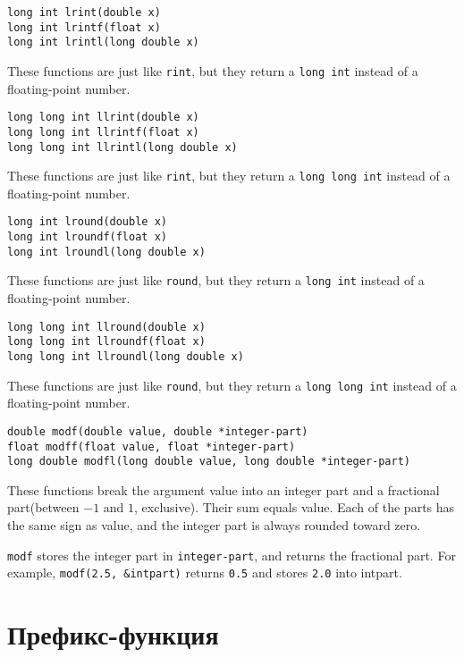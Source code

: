 \documentclass[12pt, titlepage]{article}
\renewcommand{\tt}[1]{\texttt{\small #1}}
\begin{document}
\begin{verbatim}
long int lrint(double x)
long int lrintf(float x)
long int lrintl(long double x)
\end{verbatim}
These functions are just like \tt{rint}, but they return a \tt{long int} instead of a floating-point number.

\begin{verbatim}
long long int llrint(double x)
long long int llrintf(float x)
long long int llrintl(long double x)
\end{verbatim}
These functions are just like \tt{rint}, but they return a \tt{long long int} instead of a floating-point number.

\begin{verbatim}
long int lround(double x)
long int lroundf(float x)
long int lroundl(long double x)
\end{verbatim}
These functions are just like \tt{round}, but they return a \tt{long int} instead of a floating-point number.

\begin{verbatim}
long long int llround(double x)
long long int llroundf(float x)
long long int llroundl(long double x)
\end{verbatim}
These functions are just like \tt{round}, but they return a \tt{long long int} instead of a floating-point number.

\begin{verbatim}
double modf(double value, double *integer-part)
float modff(float value, float *integer-part)
long double modfl(long double value, long double *integer-part)
\end{verbatim}
These functions break the argument value into an integer part and a fractional part(between $-1$ and $1$, exclusive). Their sum equals value. Each of the parts has the same sign as value, and the integer part is always rounded toward zero.

\tt{modf} stores the integer part in \tt{*integer-part}, and returns the fractional part. For example, \tt{modf(2.5, \&intpart)} returns \tt{0.5} and stores \tt{2.0} into intpart.


\section{Префикс-функция}
\end{document}
